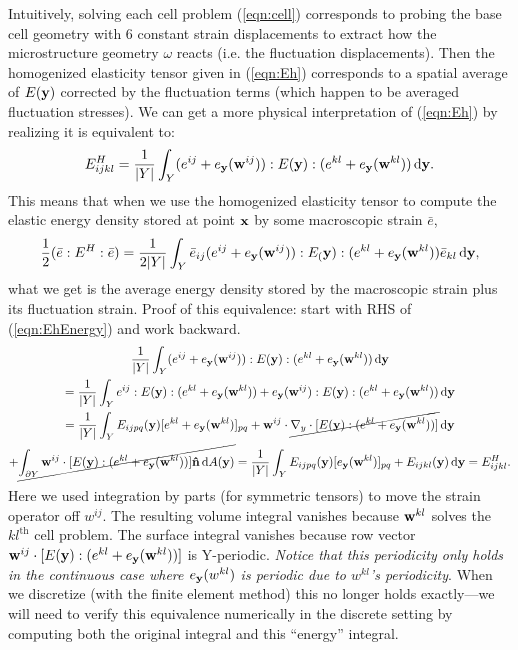 \documentclass[10pt]{article}
\begin{document}
Intuitively, solving each cell problem (\ref{eqn:cell}) corresponds to probing
the base cell geometry with 6 constant strain displacements to extract how the
microstructure geometry $\omega$ reacts (i.e. the fluctuation displacements).
Then the homogenized elasticity tensor given in (\ref{eqn:Eh}) corresponds to a
spatial average of $E({\bf y})$ corrected by the fluctuation terms (which
happen to be averaged fluctuation stresses). We can get a more physical
interpretation of (\ref{eqn:Eh}) by realizing it is equivalent to:
\begin{equation}
    \label{eqn:EhEnergy}
    E^H_{ijkl} = \frac{1}{|Y|} \int_Y (e^{ij} + e_{\bf y}({\bf w}^{ij})) : E({\bf y}) : (e^{kl} + e_{\bf y}({\bf w}^{kl})) \, \mathrm{d} {\bf y}.
\end{equation}
This means that when we use the homogenized elasticity tensor to compute the
elastic energy density stored at point ${\bf x}$ by some macroscopic strain
$\bar{e}$,
$$
\frac{1}{2} (\bar{e} : E^H :\bar{e}) =
\frac{1}{2|Y|} \int_Y \bar{e}_{ij} (e^{ij} + e_{\bf y}({\bf w}^{ij})) : E_({\bf y}) : (e^{kl} + e_{\bf y}({\bf w}^{kl})) \bar{e}_{kl} \, \mathrm{d} {\bf y},
$$
what we get is the average energy density stored by the macroscopic strain plus
its fluctuation strain. Proof of this equivalence: start with RHS of
(\ref{eqn:EhEnergy}) and work backward.
\begin{gather*}
\frac{1}{|Y|} \int_Y (e^{ij} + e_{\bf y}({\bf w}^{ij})) : E({\bf y}) : (e^{kl} + e_{\bf y}({\bf w}^{kl})) \, \mathrm{d} {\bf y} \\
= \frac{1}{|Y|} \int_Y e^{ij} : E({\bf y}) : (e^{kl} + e_{\bf y}({\bf w}^{kl})) +
    e_{\bf y}({\bf w}^{ij}) : E({\bf y}) : (e^{kl} + e_{\bf y}({\bf w}^{kl})) \, \mathrm{d} {\bf y} \\
    = \frac{1}{|Y|} \int_Y E_{ijpq}({\bf y}) [e^{kl} + e_{\bf y}({\bf w}^{kl})]_{pq} +
{{\bf w}}^{ij} \cdot \cancel{\nabla_y \cdot [E({\bf y}) : (e^{kl} + e_{\bf y}({\bf w}^{kl}))]} \, \mathrm{d} {\bf y} \\
+ \cancel{\int_{\partial Y} {\bf w}^{ij} \cdot [E({\bf y}) : (e^{kl} + e_{\bf y}({\bf w}^{kl}))] {\bf \hat{n}} \, \mathrm{d} A({\bf y})}
= \frac{1}{|Y|} \int_Y E_{ijpq}({\bf y}) [e_{\bf y}({\bf w}^{kl})]_{pq} + E_{ijkl}({\bf y}) \, \mathrm{d} {\bf y} = E^H_{ijkl}.
\end{gather*}
Here we used integration by parts (for symmetric tensors) to move the strain
operator off $w^{ij}$. The resulting volume integral vanishes because ${\bf
w}^{kl}$ solves the $kl^\text{th}$ cell problem. The surface integral vanishes
because row vector ${\bf w}^{ij} \cdot [E({\bf y}) : (e^{kl} + e_{\bf
y}({\bf w}^{kl}))]$ is Y-periodic. {\em Notice that this periodicity only holds
in the continuous case where $e_{\bf y}(w^{kl})$ is periodic due to $w^{kl}$'s
periodicity}. When we discretize (with the finite element method) this no
longer holds exactly---we will need to verify this equivalence numerically in
the discrete setting by computing both the original integral and this
``energy'' integral.
\end{document}

